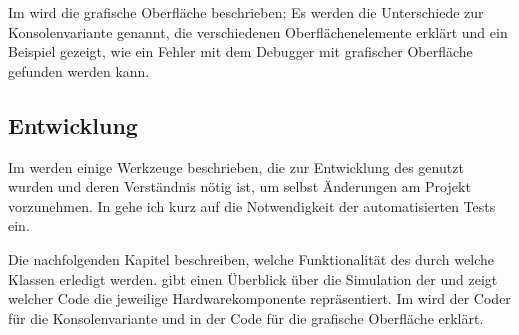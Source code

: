 Im  wird die grafische Oberfläche beschrieben; Es werden die Unterschiede zur Konsolenvariante genannt, die verschiedenen Oberflächenelemente erklärt und ein Beispiel gezeigt, wie ein Fehler mit dem Debugger mit grafischer Oberfläche gefunden werden kann.

\subsection*{Entwicklung}
Im  werden einige Werkzeuge beschrieben, die zur Entwicklung des \md{} genutzt wurden und deren Verständnis nötig ist, um selbst Änderungen am Projekt vorzunehmen. In  gehe ich kurz auf die Notwendigkeit der automatisierten Tests ein.

Die nachfolgenden Kapitel beschreiben, welche Funktionalität des \md{} durch welche Klassen erledigt werden.  gibt einen Überblick über die Simulation der \mic{} und zeigt welcher Code die jeweilige Hardwarekomponente repräsentiert. Im  wird der Coder für die Konsolenvariante und in  der Code für die grafische Oberfläche erklärt.